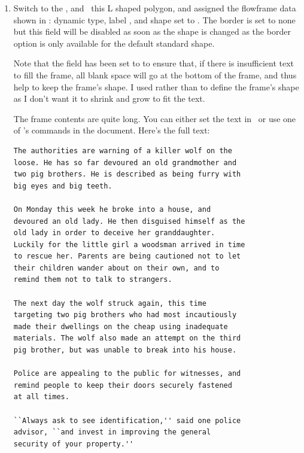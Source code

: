 \begin{enumerate}
[]
{}
{Newspaper Example\dash Added L Shaped Frame}

\item Switch to the , and
\select\ this L shaped polygon, and assigned the \gls{flowframe} data
shown in : dynamic type, label ,
and shape set to . The border is
set to none but this field will be disabled as soon as the shape is
changed as the border option is only available for the default
standard shape.

Note that the  field has been set to
 to ensure that, if there is
insufficient text to fill the frame, all blank space will go at the
bottom of the frame, and thus help to keep the frame's shape. I
used  rather than
 to define the frame's shape
as I don't want it to shrink and grow to fit the text.

The frame contents are quite long. You can either set the text in
\FlowframTk\ or use one of 's commands in the
document. Here's the full text:
\begin{verbatim}
The authorities are warning of a killer wolf on the
loose. He has so far devoured an old grandmother and
two pig brothers. He is described as being furry with
big eyes and big teeth.

On Monday this week he broke into a house, and 
devoured an old lady. He then disguised himself as the
old lady in order to deceive her granddaughter. 
Luckily for the little girl a woodsman arrived in time 
to rescue her. Parents are being cautioned not to let 
their children wander about on their own, and to 
remind them not to talk to strangers.

The next day the wolf struck again, this time 
targeting two pig brothers who had most incautiously 
made their dwellings on the cheap using inadequate 
materials. The wolf also made an attempt on the third 
pig brother, but was unable to break into his house.

Police are appealing to the public for witnesses, and 
remind people to keep their doors securely fastened 
at all times.

``Always ask to see identification,'' said one police 
advisor, ``and invest in improving the general 
security of your property.''
\end{verbatim}


\end{enumerate}
